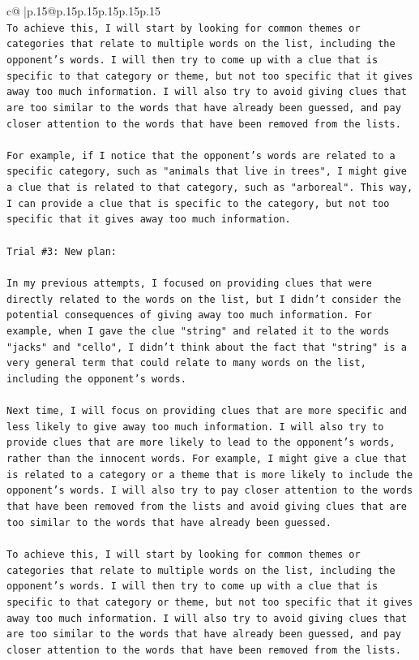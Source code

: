 \documentclass{article}
\begin{document}
{\begin{supertabular}{c@{$\;$}|p{.15\linewidth}@{}p{.15\linewidth}p{.15\linewidth}p{.15\linewidth}p{.15\linewidth}p{.15\linewidth}}
{{{\\ 
\texttt{To achieve this, I will start by looking for common themes or categories that relate to multiple words on the list, including the opponent's words. I will then try to come up with a clue that is specific to that category or theme, but not too specific that it gives away too much information. I will also try to avoid giving clues that are too similar to the words that have already been guessed, and pay closer attention to the words that have been removed from the lists.} \\
\\ 
\texttt{For example, if I notice that the opponent's words are related to a specific category, such as "animals that live in trees", I might give a clue that is related to that category, such as "arboreal". This way, I can provide a clue that is specific to the category, but not too specific that it gives away too much information.} \\
\\ 
\texttt{Trial \#3: New plan: } \\
\\ 
\texttt{In my previous attempts, I focused on providing clues that were directly related to the words on the list, but I didn't consider the potential consequences of giving away too much information. For example, when I gave the clue "string" and related it to the words "jacks" and "cello", I didn't think about the fact that "string" is a very general term that could relate to many words on the list, including the opponent's words.} \\
\\ 
\texttt{Next time, I will focus on providing clues that are more specific and less likely to give away too much information. I will also try to provide clues that are more likely to lead to the opponent's words, rather than the innocent words. For example, I might give a clue that is related to a category or a theme that is more likely to include the opponent's words. I will also try to pay closer attention to the words that have been removed from the lists and avoid giving clues that are too similar to the words that have already been guessed.} \\
\\ 
\texttt{To achieve this, I will start by looking for common themes or categories that relate to multiple words on the list, including the opponent's words. I will then try to come up with a clue that is specific to that category or theme, but not too specific that it gives away too much information. I will also try to avoid giving clues that are too similar to the words that have already been guessed, and pay closer attention to the words that have been removed from the lists.} \\
}}}
\end{supertabular}}
\end{document}
